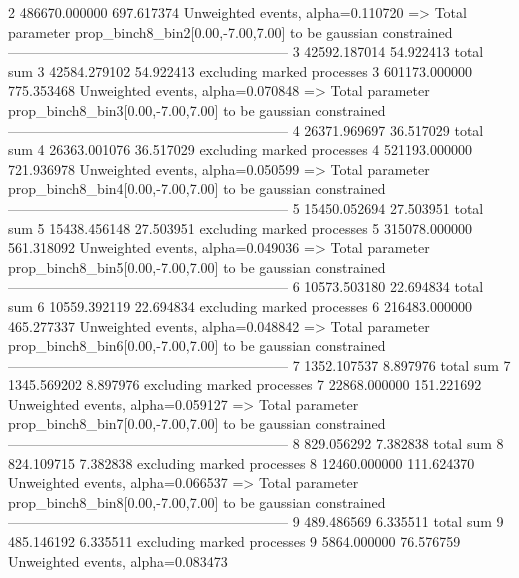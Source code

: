 2          486670.000000   697.617374      Unweighted events, alpha=0.110720
  => Total parameter prop_binch8_bin2[0.00,-7.00,7.00] to be gaussian constrained
------------------------------------------------------------
3          42592.187014    54.922413       total sum                     
3          42584.279102    54.922413       excluding marked processes    
3          601173.000000   775.353468      Unweighted events, alpha=0.070848
  => Total parameter prop_binch8_bin3[0.00,-7.00,7.00] to be gaussian constrained
------------------------------------------------------------
4          26371.969697    36.517029       total sum                     
4          26363.001076    36.517029       excluding marked processes    
4          521193.000000   721.936978      Unweighted events, alpha=0.050599
  => Total parameter prop_binch8_bin4[0.00,-7.00,7.00] to be gaussian constrained
------------------------------------------------------------
5          15450.052694    27.503951       total sum                     
5          15438.456148    27.503951       excluding marked processes    
5          315078.000000   561.318092      Unweighted events, alpha=0.049036
  => Total parameter prop_binch8_bin5[0.00,-7.00,7.00] to be gaussian constrained
------------------------------------------------------------
6          10573.503180    22.694834       total sum                     
6          10559.392119    22.694834       excluding marked processes    
6          216483.000000   465.277337      Unweighted events, alpha=0.048842
  => Total parameter prop_binch8_bin6[0.00,-7.00,7.00] to be gaussian constrained
------------------------------------------------------------
7          1352.107537     8.897976        total sum                     
7          1345.569202     8.897976        excluding marked processes    
7          22868.000000    151.221692      Unweighted events, alpha=0.059127
  => Total parameter prop_binch8_bin7[0.00,-7.00,7.00] to be gaussian constrained
------------------------------------------------------------
8          829.056292      7.382838        total sum                     
8          824.109715      7.382838        excluding marked processes    
8          12460.000000    111.624370      Unweighted events, alpha=0.066537
  => Total parameter prop_binch8_bin8[0.00,-7.00,7.00] to be gaussian constrained
------------------------------------------------------------
9          489.486569      6.335511        total sum                     
9          485.146192      6.335511        excluding marked processes    
9          5864.000000     76.576759       Unweighted events, alpha=0.083473

